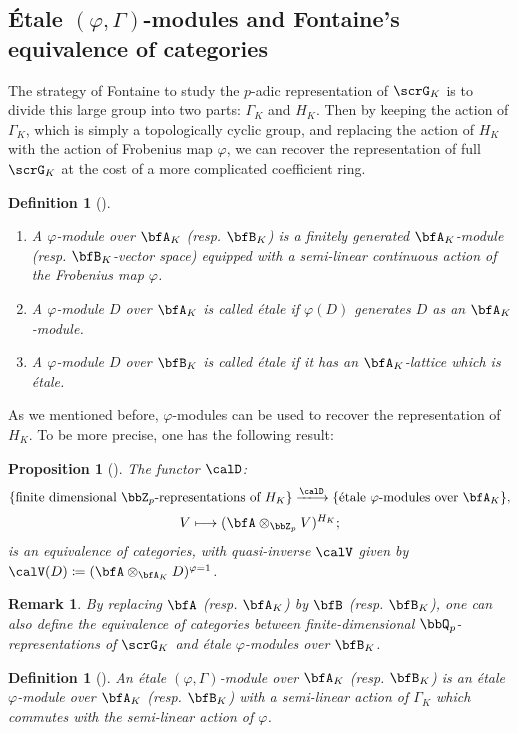 \documentclass[a4paper,oneside]{amsart}
\let\xlto\xlongrightarrow
\newtheorem{remark}[theorem]{Remark}
\newtheorem{proposition}[theorem]{Proposition}
\newtheorem{definition}[theorem]{Definition}
\numberwithin{equation}{section}
\begin{document}
\subsection{\'Etale $(\varphi,\Gamma)$-modules and Fontaine's equivalence of categories}
The strategy of Fontaine to study the $p$-adic representation of $\scrG_K$ is to divide this large group into two parts: $\Gamma_K$ and $H_K$. Then by keeping the action of $\Gamma_K$, which is simply a topologically cyclic group, and replacing the action of $H_K$ with the action of Frobenius map $\varphi$, we can recover the representation of full $\scrG_K$ at the cost of a more complicated coefficient ring.
\begin{definition}[{\cite{Fontaine2007}}]\leavevmode
    \begin{enumerate}
        \item A $\varphi$-module over $\bfA_K$ (resp. $\bfB_K$) is a finitely generated $\bfA_K$-module (resp. $\bfB_K$-vector space) equipped with a semi-linear continuous action of the Frobenius map $\varphi$.
        \item A $\varphi$-module $D$ over $\bfA_K$ is called \'etale if $\varphi(D)$ generates $D$ as an $\bfA_K$-module.
        \item A $\varphi$-module $D$ over $\bfB_K$ is called \'etale if it has an $\bfA_K$-lattice which is \'etale.
    \end{enumerate}
\end{definition}
As we mentioned before, $\varphi$-modules can be used to recover the representation of $H_K$. To be more precise, one has the following result:
\begin{proposition}[{\cite[Proposition 1.2.6]{Fontaine2007}}]\label{thm:44873}
    The functor $\calD$:
    $$\{\text{finite dimensional }\bbZ_p\text{-representations of }H_K\}\xlto{\calD} \{\text{\'etale } \varphi\text{-modules over }\bfA_K\},$$
    $$V\longmapsto (\bfA\otimes_{\bbZ_p} V)^{H_K};$$
    is an equivalence of categories, with quasi-inverse $\calV$ given by $\calV(D)\coloneqq (\bfA\otimes_{\bfA_K} D)^{\varphi=1}$.
\end{proposition}
\begin{remark}\label{rmk:44018}
    By replacing $\bfA$ (resp. $\bfA_K$) by $\bfB$ (resp. $\bfB_K$), one can also define the equivalence of categories between finite-dimensional $\bbQ_p$-representations of $\scrG_K$ and \'etale $\varphi$-modules over $\bfB_K$.
\end{remark}
\begin{definition}[{\cite{Fontaine2007}}]
    An \'etale $(\varphi,\Gamma)$-module over $\bfA_K$ (resp. $\bfB_K$) is an \'etale $\varphi$-module over $\bfA_K$ (resp. $\bfB_K$) with a semi-linear action of $\Gamma_K$ which commutes with the semi-linear action of $\varphi$.
\end{definition}
\end{document}
